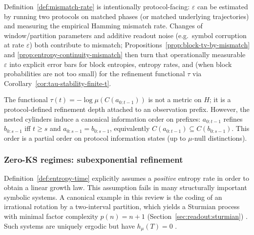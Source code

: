 \begin{remark}\label{rem:mismatch-interpretation}
Definition~\ref{def:mismatch-rate} is intentionally protocol-facing: $\varepsilon$ can be estimated by running two protocols on matched phases (or matched underlying trajectories) and measuring the empirical Hamming mismatch rate. Changes of window/partition parameters and additive readout noise (e.g.\ symbol corruption at rate $\varepsilon$) both contribute to mismatch; Propositions~\ref{prop:block-tv-by-mismatch} and \ref{prop:entropy-continuity-mismatch} then turn that operationally measurable $\varepsilon$ into explicit error bars for block entropies, entropy rates, and (when block probabilities are not too small) for the refinement functional $\tau$ via Corollary~\ref{cor:tau-stability-finite-t}.
\end{remark}

\begin{remark}\label{rem:tau-structure}
The functional $\tau(t)=-\log\mu(C(a_{0:t-1}))$ is not a metric on $H$; it is a protocol-defined refinement depth attached to an observation prefix. However, the nested cylinders induce a canonical information order on prefixes: $a_{0:t-1}$ refines $b_{0:s-1}$ iff $t\ge s$ and $a_{0:s-1}=b_{0:s-1}$, equivalently $C(a_{0:t-1})\subseteq C(b_{0:s-1})$. This order is a partial order on protocol information states (up to $\mu$-null distinctions).
\end{remark}

\subsubsection{Zero-KS regimes: subexponential refinement}\label{sec:info-time:zero-ks}

Definition~\ref{def:entropy-time} explicitly assumes a \emph{positive} entropy rate in order to obtain a linear growth law. This assumption fails in many structurally important symbolic systems. A canonical example in this review is the coding of an irrational rotation by a two-interval partition, which yields a Sturmian process with minimal factor complexity $p(n)=n+1$ (Section~\ref{sec:readout:sturmian}) \cite{Queffelec2010,Lothaire2002}. Such systems are uniquely ergodic but have $h_\mu(T)=0$ \cite{Walters1982}.

